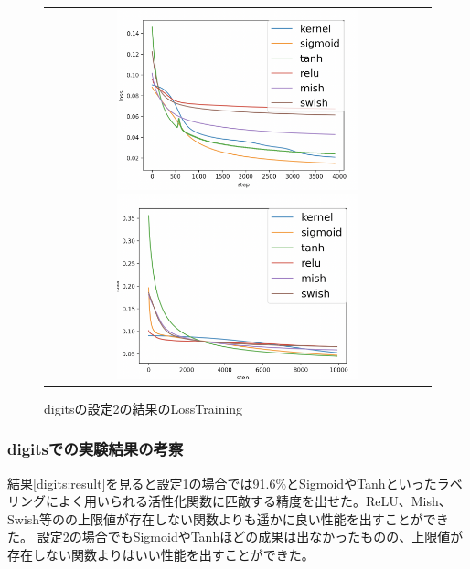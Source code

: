 \begin{figure}[hbtp]
    \begin{center}
        \begin{tabular}{c}
            \begin{minipage}{0.5\hsize}
                \includegraphics[clip, width=7cm]{asset/digits_0.01_4000_3_002_sgd_non_kaiming_uniform.png}
                    \caption{digitsの設定1の結果のLossTraining}
                    \label{digits_1}
            \end{minipage}
            \hspace{10pt}
            \begin{minipage}{0.5\hsize}
                \includegraphics[clip, width=7cm]{asset/digits_0.001_10000_3_002_adam_non_kaiming_uniform.png}
                    \caption{digitsの設定2の結果のLossTraining}
                    \label{digits_2}
            \end{minipage}
        \end{tabular}
    \end{center}
\end{figure}


\subsubsection{digitsでの実験結果の考察}
結果\ref{digits:result}を見ると設定1の場合では91.6\%とSigmoidやTanhといったラベリングによく用いられる活性化関数に匹敵する精度を出せた。ReLU、Mish、Swish等のの上限値が存在しない関数よりも遥かに良い性能を出すことができた。
設定2の場合でもSigmoidやTanhほどの成果は出なかったものの、上限値が存在しない関数よりはいい性能を出すことができた。

